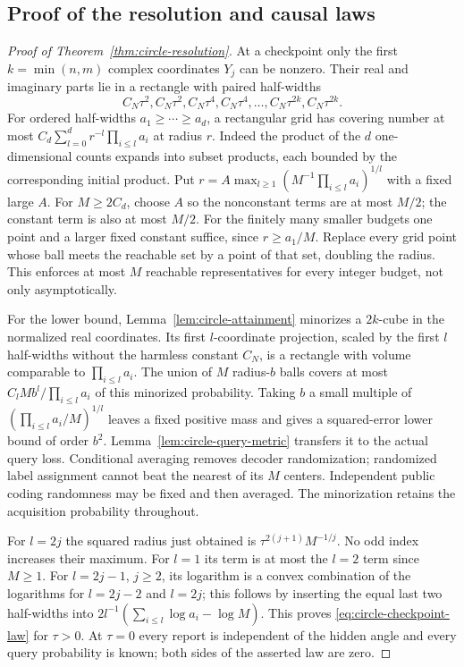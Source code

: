 \documentclass[11pt]{amsart}
\theoremstyle{definition}\newtheorem{definition}[theorem]{Definition}
\theoremstyle{remark}\newtheorem{remark}[theorem]{Remark}
\begin{document}
\subsection{Proof of the resolution and causal laws}
\begin{proof}[Proof of Theorem~\ref{thm:circle-resolution}]
At a checkpoint only the first $k=\min(n,m)$ complex coordinates $Y_j$
can be nonzero. Their real and imaginary parts lie in a rectangle with
paired half-widths
\[
 C_N\tau^2,C_N\tau^2,C_N\tau^4,C_N\tau^4,
             \ldots,C_N\tau^{2k},C_N\tau^{2k}.
\]
For ordered half-widths $a_1\ge\cdots\ge a_d$, a rectangular grid
has covering number at most
$C_d\sum_{l=0}^d r^{-l}\prod_{i\le l}a_i$ at radius $r$.
Indeed the product of the $d$ one-dimensional counts expands into
subset products, each bounded by the corresponding initial product.
Put $r=A\max_{l\ge1}(M^{-1}\prod_{i\le l}a_i)^{1/l}$ with a
fixed large $A$. For $M\ge2C_d$, choose $A$ so the nonconstant
terms are at most $M/2$; the constant term is also at most $M/2$.
For the finitely many smaller budgets one point and a larger fixed
constant suffice, since $r\ge a_1/M$. Replace every grid point whose
ball meets the reachable set by a point of that set, doubling the radius.
This enforces at most $M$ reachable representatives for every integer
budget, not only asymptotically.

For the lower bound, Lemma~\ref{lem:circle-attainment} minorizes a
$2k$-cube in the normalized real coordinates. Its first $l$-coordinate
projection, scaled by the first $l$ half-widths without the harmless
constant $C_N$, is a rectangle with volume comparable to
$\prod_{i\le l}a_i$. The union of $M$ radius-$b$ balls covers at
most $C_lMb^l/\prod_{i\le l}a_i$ of this minorized probability.
Taking $b$ a small multiple of $(\prod_{i\le l}a_i/M)^{1/l}$
leaves a fixed positive mass and gives a squared-error lower bound of
order $b^2$. Lemma~\ref{lem:circle-query-metric} transfers it to the
actual query loss. Conditional averaging removes decoder randomization;
randomized label assignment cannot beat the nearest of its $M$ centers.
Independent public coding randomness may be fixed and then averaged.
The minorization retains the acquisition probability throughout.

For $l=2j$ the squared radius just obtained is
$\tau^{2(j+1)}M^{-1/j}$. No odd index increases their maximum.
For $l=1$ its term is at most the $l=2$ term since $M\ge1$.
For $l=2j-1$, $j\ge2$, its logarithm is a convex combination of
the logarithms for $l=2j-2$ and $l=2j$; this follows by inserting
the equal last two half-widths into
$2l^{-1}(\sum_{i\le l}\log a_i-\log M)$.
This proves \eqref{eq:circle-checkpoint-law} for $\tau>0$.
At $\tau=0$ every report is independent of the hidden angle and every
query probability is known; both sides of the asserted law are zero.


\end{proof}
\end{document}
